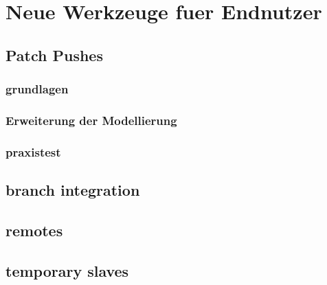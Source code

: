 \chapter{Neue Werkzeuge fuer Endnutzer}
\section{Patch Pushes}
\subsection{grundlagen}
\subsection{Erweiterung der Modellierung}
\subsection{praxistest}
\section{branch integration}
\section{remotes}
\section{temporary slaves}

